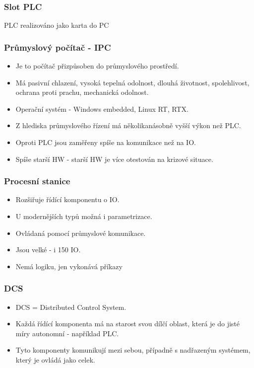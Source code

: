 \begin{itemize}
\subsubsection*{Slot PLC}
PLC realizováno jako karta do PC

\subsubsection*{Průmyslový počítač - IPC}
\begin{itemize}
  \item Je to počítač přizpůsoben do průmyslového prostředí.
  \item Má pasivní chlazení, vysoká tepelná odolnost, dlouhá životnost, spolehlivost, ochrana proti prachu, mechanická odolnost.
  \item Operační systém - Windows embedded, Linux RT, RTX.
  \item Z hlediska průmyslového řízení má několikanásobně vyšší výkon než PLC.
  \item Oproti PLC jsou zaměřeny spíše na komunikace než na IO.
  \item Spíše starší HW - starší HW je více otestován na krizové situace.
\end{itemize}

\subsubsection*{Procesní stanice}
\begin{itemize}
  \item Rozšiřuje řídící komponentu o IO.
  \item U modernějších typů možná i parametrizace.
  \item Ovládaná pomocí průmyslové komunikace.
  \item Jsou velké - i 150 IO.
  \item Nemá logiku, jen vykonává příkazy
\end{itemize}

\subsubsection*{DCS}
\begin{itemize}
  \item DCS = Distributed Control System.
  \item Každá řídící komponenta má na starost svou dílčí oblast, která je do jisté míry autonomní - například PLC.
  \item Tyto komponenty komunikují mezi sebou, případně s nadřazeným systémem, který je ovládá jako celek.
\end{itemize}


\end{itemize}
